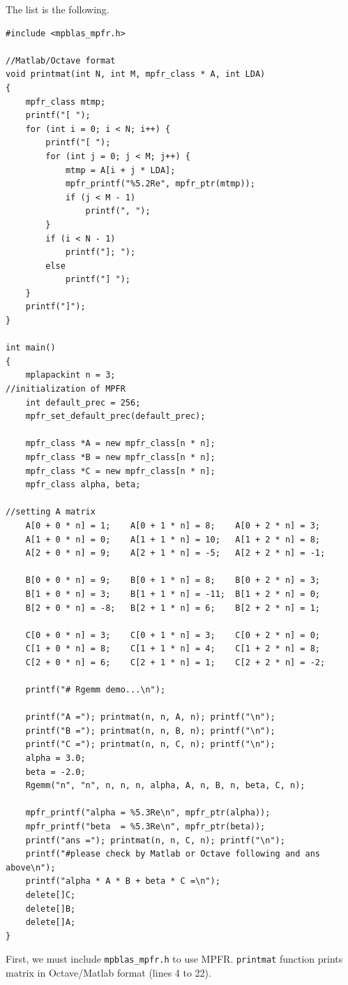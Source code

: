 \documentclass[12pt]{article}
\begin{document}
The list is the following.
\begin{lstlisting}
#include <mpblas_mpfr.h>

//Matlab/Octave format
void printmat(int N, int M, mpfr_class * A, int LDA)
{
    mpfr_class mtmp;
    printf("[ ");
    for (int i = 0; i < N; i++) {
        printf("[ ");
        for (int j = 0; j < M; j++) {
            mtmp = A[i + j * LDA];
            mpfr_printf("%5.2Re", mpfr_ptr(mtmp));
            if (j < M - 1)
                printf(", ");
        }
        if (i < N - 1)
            printf("]; ");
        else
            printf("] ");
    }
    printf("]");
}

int main()
{
    mplapackint n = 3;
//initialization of MPFR
    int default_prec = 256;
    mpfr_set_default_prec(default_prec);

    mpfr_class *A = new mpfr_class[n * n];
    mpfr_class *B = new mpfr_class[n * n];
    mpfr_class *C = new mpfr_class[n * n];
    mpfr_class alpha, beta;

//setting A matrix
    A[0 + 0 * n] = 1;    A[0 + 1 * n] = 8;    A[0 + 2 * n] = 3;
    A[1 + 0 * n] = 0;    A[1 + 1 * n] = 10;   A[1 + 2 * n] = 8;
    A[2 + 0 * n] = 9;    A[2 + 1 * n] = -5;   A[2 + 2 * n] = -1;

    B[0 + 0 * n] = 9;    B[0 + 1 * n] = 8;    B[0 + 2 * n] = 3;
    B[1 + 0 * n] = 3;    B[1 + 1 * n] = -11;  B[1 + 2 * n] = 0;
    B[2 + 0 * n] = -8;   B[2 + 1 * n] = 6;    B[2 + 2 * n] = 1;

    C[0 + 0 * n] = 3;    C[0 + 1 * n] = 3;    C[0 + 2 * n] = 0;
    C[1 + 0 * n] = 8;    C[1 + 1 * n] = 4;    C[1 + 2 * n] = 8;
    C[2 + 0 * n] = 6;    C[2 + 1 * n] = 1;    C[2 + 2 * n] = -2;

    printf("# Rgemm demo...\n");

    printf("A ="); printmat(n, n, A, n); printf("\n");
    printf("B ="); printmat(n, n, B, n); printf("\n");
    printf("C ="); printmat(n, n, C, n); printf("\n");
    alpha = 3.0;
    beta = -2.0;
    Rgemm("n", "n", n, n, n, alpha, A, n, B, n, beta, C, n);

    mpfr_printf("alpha = %5.3Re\n", mpfr_ptr(alpha));
    mpfr_printf("beta  = %5.3Re\n", mpfr_ptr(beta));
    printf("ans ="); printmat(n, n, C, n); printf("\n");
    printf("#please check by Matlab or Octave following and ans above\n");
    printf("alpha * A * B + beta * C =\n");
    delete[]C;
    delete[]B;
    delete[]A;
}
\end{lstlisting}
First, we must include {\tt mpblas\_mpfr.h} to use MPFR. {\tt printmat} function prints matrix in Octave/Matlab format (lines 4 to 22).
\end{document}
